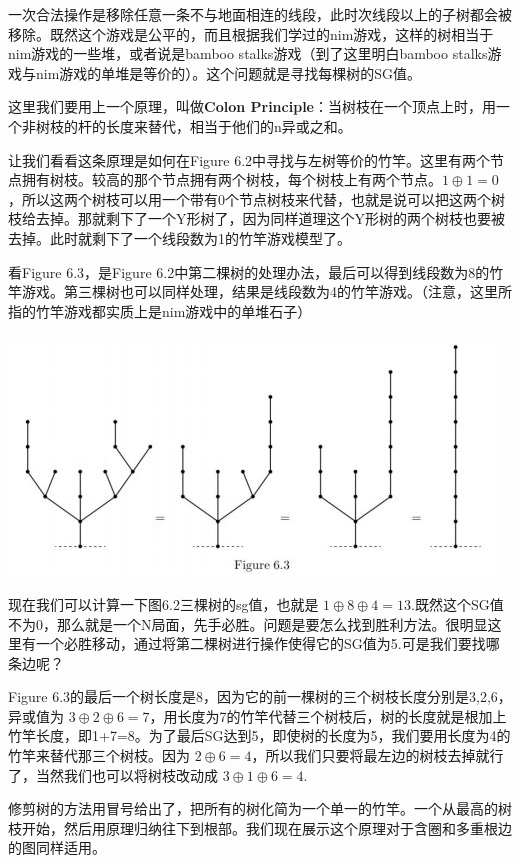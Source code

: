 	一次合法操作是移除任意一条不与地面相连的线段，此时次线段以上的子树都会被移除。既然这个游戏是公平的，而且根据我们学过的nim游戏，这样的树相当于nim游戏的一些堆，或者说是bamboo stalks游戏（到了这里明白bamboo stalks游戏与nim游戏的单堆是等价的）。这个问题就是寻找每棵树的SG值。
	
	这里我们要用上一个原理，叫做\textbf{Colon Principle}：当树枝在一个顶点上时，用一个非树枝的杆的长度来替代，相当于他们的n异或之和。
	
	让我们看看这条原理是如何在Figure 6.2中寻找与左树等价的竹竿。这里有两个节点拥有树枝。较高的那个节点拥有两个树枝，每个树枝上有两个节点。$1\oplus1=0$，所以这两个树枝可以用一个带有0个节点树枝来代替，也就是说可以把这两个树枝给去掉。那就剩下了一个Y形树了，因为同样道理这个Y形树的两个树枝也要被去掉。此时就剩下了一个线段数为1的竹竿游戏模型了。
	
	看Figure 6.3，是Figure 6.2中第二棵树的处理办法，最后可以得到线段数为8的竹竿游戏。第三棵树也可以同样处理，结果是线段数为4的竹竿游戏。（注意，这里所指的竹竿游戏都实质上是nim游戏中的单堆石子）
	\begin{center}
	\includegraphics{./source/img7.jpg}
	\end{center}
	
	现在我们可以计算一下图6.2三棵树的sg值，也就是 $1\oplus8\oplus4=13$.既然这个SG值不为0，那么就是一个N局面，先手必胜。问题是要怎么找到胜利方法。很明显这里有一个必胜移动，通过将第二棵树进行操作使得它的SG值为5.可是我们要找哪条边呢？
	
	Figure 6.3的最后一个树长度是8，因为它的前一棵树的三个树枝长度分别是3,2,6，异或值为 $3\oplus2\oplus6=7$，用长度为7的竹竿代替三个树枝后，树的长度就是根加上竹竿长度，即1+7=8。为了最后SG达到5，即使树的长度为5，我们要用长度为4的竹竿来替代那三个树枝。因为 $2\oplus6=4$，所以我们只要将最左边的树枝去掉就行了，当然我们也可以将树枝改动成 $3\oplus1\oplus6=4$.
	
	修剪树的方法用冒号给出了，把所有的树化简为一个单一的竹竿。一个从最高的树枝开始，然后用原理归纳往下到根部。我们现在展示这个原理对于含圈和多重根边的图同样适用。

